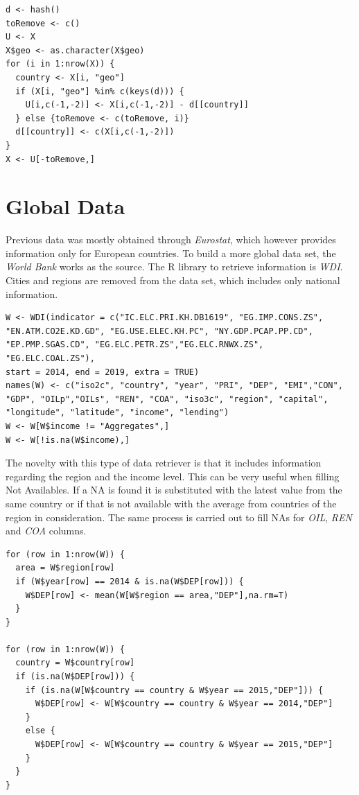 \documentclass[a4paper,12pt]{book}
\begin{document}
\begin{appendices}
\begin{verbatim}
d <- hash()
toRemove <- c()
U <- X
X$geo <- as.character(X$geo)
for (i in 1:nrow(X)) {
  country <- X[i, "geo"]
  if (X[i, "geo"] %in% c(keys(d))) {
    U[i,c(-1,-2)] <- X[i,c(-1,-2)] - d[[country]]
  } else {toRemove <- c(toRemove, i)}
  d[[country]] <- c(X[i,c(-1,-2)])
}
X <- U[-toRemove,]
\end{verbatim}

\section*{Global Data}

Previous data was mostly obtained through \textit{Eurostat}, which however provides information only for European countries. To build a more global data set, the \textit{World Bank} works as the source. The R library to retrieve information is \textit{WDI}. Cities and regions are removed from the data set, which includes only national information.

\begin{verbatim}
W <- WDI(indicator = c("IC.ELC.PRI.KH.DB1619", "EG.IMP.CONS.ZS",
"EN.ATM.CO2E.KD.GD", "EG.USE.ELEC.KH.PC", "NY.GDP.PCAP.PP.CD",
"EP.PMP.SGAS.CD", "EG.ELC.PETR.ZS","EG.ELC.RNWX.ZS", "EG.ELC.COAL.ZS"),
start = 2014, end = 2019, extra = TRUE)
names(W) <- c("iso2c", "country", "year", "PRI", "DEP", "EMI","CON",
"GDP", "OILp","OILs", "REN", "COA", "iso3c", "region", "capital",
"longitude", "latitude", "income", "lending")
W <- W[W$income != "Aggregates",]
W <- W[!is.na(W$income),]
\end{verbatim}

The novelty with this type of data retriever is that it includes information regarding the region and the income level. This can be very useful when filling Not Availables. If a NA is found it is substituted with the latest value from the same country or if that is not available with the average from countries of the region in consideration. The same process is carried out to fill NAs for \textit{OIL}, \textit{REN} and \textit{COA} columns.

\begin{verbatim}
for (row in 1:nrow(W)) {
  area = W$region[row]
  if (W$year[row] == 2014 & is.na(W$DEP[row])) {
    W$DEP[row] <- mean(W[W$region == area,"DEP"],na.rm=T)
  }
}

for (row in 1:nrow(W)) {
  country = W$country[row]
  if (is.na(W$DEP[row])) {
    if (is.na(W[W$country == country & W$year == 2015,"DEP"])) {
      W$DEP[row] <- W[W$country == country & W$year == 2014,"DEP"]
    }
    else {
      W$DEP[row] <- W[W$country == country & W$year == 2015,"DEP"]
    }
  }
}
\end{verbatim}


\end{appendices}
\end{document}
